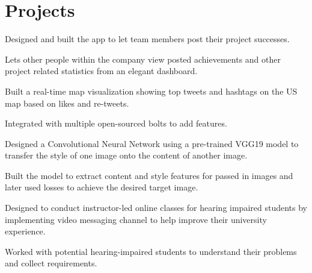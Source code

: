 \documentclass[]{rinkal_resume}
\begin{document}
\begin{minipage}[t]{0.69\textwidth}

\section{Projects}
\begin{tightemize}
\item Designed and built the app to let team members post their project successes.
\item Lets other people within the company view posted achievements and other project related statistics from an elegant dashboard.
\end{tightemize}
\smallsectionsep

\begin{tightemize}
\item Built a real-time map visualization showing top tweets and hashtags on the US map based on likes and re-tweets.
\item Integrated with multiple open-sourced bolts to add features.
\end{tightemize}
\smallsectionsep

\begin{tightemize}
\item Designed a Convolutional Neural Network using a pre-trained VGG19 model to transfer the style of one image onto the content of another image.
\item Built the model to extract content and style features for passed in images and later used losses to achieve the desired target image.
\end{tightemize}
\smallsectionsep

\begin{tightemize}
\item Designed to conduct instructor-led online classes for hearing impaired students by implementing video messaging channel to help improve their university experience.
\item Worked with potential hearing-impaired students to understand their problems and collect requirements.
\end{tightemize}
\smallsectionsep


\end{minipage}
\end{document}
